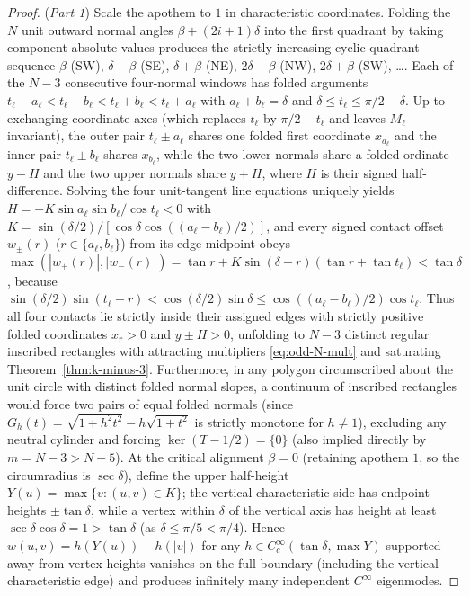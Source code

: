 \documentclass[11pt,reqno]{amsart}
\theoremstyle{definition}
\theoremstyle{remark}
\begin{document}
\begin{proof}
(\emph{Part 1}) Scale the apothem to $1$ in characteristic coordinates. Folding the $N$ unit outward normal angles $\beta + (2i+1)\delta$ into the first quadrant by taking component absolute values produces the strictly increasing cyclic-quadrant sequence $\beta$ (SW), $\delta-\beta$ (SE), $\delta+\beta$ (NE), $2\delta-\beta$ (NW), $2\delta+\beta$ (SW), \dots. Each of the $N - 3$ consecutive four-normal windows has folded arguments $t_\ell - a_\ell < t_\ell - b_\ell < t_\ell + b_\ell < t_\ell + a_\ell$ with $a_\ell + b_\ell = \delta$ and $\delta \le t_\ell \le \pi/2 - \delta$. Up to exchanging coordinate axes (which replaces $t_\ell$ by $\pi/2 - t_\ell$ and leaves $M_\ell$ invariant), the outer pair $t_\ell \pm a_\ell$ shares one folded first coordinate $x_{a_\ell}$ and the inner pair $t_\ell \pm b_\ell$ shares $x_{b_\ell}$, while the two lower normals share a folded ordinate $y - H$ and the two upper normals share $y + H$, where $H$ is their signed half-difference. Solving the four unit-tangent line equations uniquely yields $H = -K \sin a_\ell \sin b_\ell / \cos t_\ell < 0$ with $K = \sin(\delta/2) / [\cos\delta \cos((a_\ell-b_\ell)/2)]$, and every signed contact offset $w_\pm(r)$ ($r \in \{a_\ell, b_\ell\}$) from its edge midpoint obeys $\max(|w_+(r)|, |w_-(r)|) = \tan r + K\sin(\delta-r)(\tan r + \tan t_\ell) < \tan\delta$, because $\sin(\delta/2)\sin(t_\ell + r) < \cos(\delta/2)\sin\delta \le \cos((a_\ell-b_\ell)/2)\cos t_\ell$. Thus all four contacts lie strictly inside their assigned edges with strictly positive folded coordinates $x_r > 0$ and $y \pm H > 0$, unfolding to $N - 3$ distinct regular inscribed rectangles with attracting multipliers \eqref{eq:odd-N-mult} and saturating Theorem~\ref{thm:k-minus-3}. Furthermore, in any polygon circumscribed about the unit circle with distinct folded normal slopes, a continuum of inscribed rectangles would force two pairs of equal folded normals (since $G_h(t) = \sqrt{1+h^2 t^2} - h\sqrt{1+t^2}$ is strictly monotone for $h \ne 1$), excluding any neutral cylinder and forcing $\ker(T-1/2) = \{0\}$ (also implied directly by $m = N - 3 > N - 5$). At the critical alignment $\beta = 0$ (retaining apothem $1$, so the circumradius is $\sec\delta$), define the upper half-height $Y(u) = \max\{v : (u,v) \in K\}$; the vertical characteristic side has endpoint heights $\pm\tan\delta$, while a vertex within $\delta$ of the vertical axis has height at least $\sec\delta \cos\delta = 1 > \tan\delta$ (as $\delta \le \pi/5 < \pi/4$). Hence $w(u,v) = h(Y(u)) - h(|v|)$ for any $h \in C_c^\infty(\tan\delta, \max Y)$ supported away from vertex heights vanishes on the full boundary (including the vertical characteristic edge) and produces infinitely many independent $C^\infty$ eigenmodes.


\end{proof}
\end{document}
